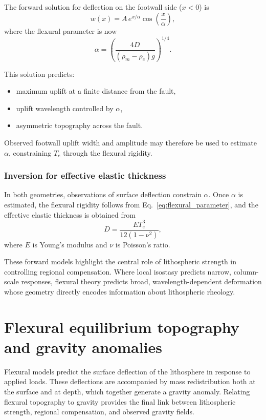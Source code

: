 The forward solution for deflection on the footwall side (\(x<0\)) is
\begin{equation}
w(x) = A \, e^{x/\alpha} \cos\!\left(\frac{x}{\alpha}\right),
\end{equation}
where the flexural parameter is now
\begin{equation}
\alpha = \left( \frac{4D}{(\rho_m - \rho_c) g} \right)^{1/4}.
\end{equation}

This solution predicts:
\begin{itemize}
  \item maximum uplift at a finite distance from the fault,
  \item uplift wavelength controlled by \( \alpha \),
  \item asymmetric topography across the fault.
\end{itemize}

Observed footwall uplift width and amplitude may therefore be used to estimate \( \alpha \), constraining \(T_e\) through the flexural rigidity.

\subsubsection{Inversion for effective elastic thickness}

In both geometries, observations of surface deflection constrain \( \alpha \). Once \( \alpha \) is estimated, the flexural rigidity follows from Eq.~\eqref{eq:flexural_parameter}, and the effective elastic thickness is obtained from
\begin{equation}
D = \frac{E T_e^3}{12(1-\nu^2)},
\end{equation}
where \(E\) is Young's modulus and \(\nu\) is Poisson's ratio.

These forward models highlight the central role of lithospheric strength in controlling regional compensation. Where local isostasy predicts narrow, column-scale responses, flexural theory predicts broad, wavelength-dependent deformation whose geometry directly encodes information about lithospheric rheology.

\section{Flexural equilibrium topography and gravity anomalies}

Flexural models predict the surface deflection of the lithosphere in response to applied loads. These deflections are accompanied by mass redistribution both at the surface and at depth, which together generate a gravity anomaly. Relating flexural topography to gravity provides the final link between lithospheric strength, regional compensation, and observed gravity fields.

